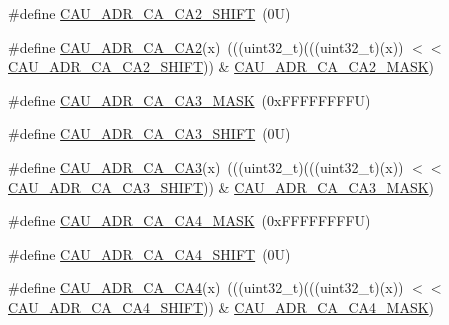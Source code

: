 \begin{DoxyCompactItemize}
\item 
\#define \mbox{\hyperlink{group___c_a_u___register___masks_ga3809e21df053cc0fffe5518686527b59}{C\+A\+U\+\_\+\+A\+D\+R\+\_\+\+C\+A\+\_\+\+C\+A2\+\_\+\+S\+H\+I\+FT}}~(0\+U)
\item 
\#define \mbox{\hyperlink{group___c_a_u___register___masks_ga2e2a6bd48203a8f976196d023b1acec0}{C\+A\+U\+\_\+\+A\+D\+R\+\_\+\+C\+A\+\_\+\+C\+A2}}(x)~(((uint32\+\_\+t)(((uint32\+\_\+t)(x)) $<$$<$ \mbox{\hyperlink{group___c_a_u___register___masks_ga3809e21df053cc0fffe5518686527b59}{C\+A\+U\+\_\+\+A\+D\+R\+\_\+\+C\+A\+\_\+\+C\+A2\+\_\+\+S\+H\+I\+FT}})) \& \mbox{\hyperlink{group___c_a_u___register___masks_ga9294c3d57841472174044b71a5a271ad}{C\+A\+U\+\_\+\+A\+D\+R\+\_\+\+C\+A\+\_\+\+C\+A2\+\_\+\+M\+A\+SK}})
\item 
\#define \mbox{\hyperlink{group___c_a_u___register___masks_ga32fe7c3ce489038db5a7614ff6c376d2}{C\+A\+U\+\_\+\+A\+D\+R\+\_\+\+C\+A\+\_\+\+C\+A3\+\_\+\+M\+A\+SK}}~(0x\+F\+F\+F\+F\+F\+F\+F\+F\+U)
\item 
\#define \mbox{\hyperlink{group___c_a_u___register___masks_ga93cb8cfd1a5fb49e223ca89c7c821ab5}{C\+A\+U\+\_\+\+A\+D\+R\+\_\+\+C\+A\+\_\+\+C\+A3\+\_\+\+S\+H\+I\+FT}}~(0\+U)
\item 
\#define \mbox{\hyperlink{group___c_a_u___register___masks_gacbf10f24a67b200c72e1b7101efa6f6b}{C\+A\+U\+\_\+\+A\+D\+R\+\_\+\+C\+A\+\_\+\+C\+A3}}(x)~(((uint32\+\_\+t)(((uint32\+\_\+t)(x)) $<$$<$ \mbox{\hyperlink{group___c_a_u___register___masks_ga93cb8cfd1a5fb49e223ca89c7c821ab5}{C\+A\+U\+\_\+\+A\+D\+R\+\_\+\+C\+A\+\_\+\+C\+A3\+\_\+\+S\+H\+I\+FT}})) \& \mbox{\hyperlink{group___c_a_u___register___masks_ga32fe7c3ce489038db5a7614ff6c376d2}{C\+A\+U\+\_\+\+A\+D\+R\+\_\+\+C\+A\+\_\+\+C\+A3\+\_\+\+M\+A\+SK}})
\item 
\#define \mbox{\hyperlink{group___c_a_u___register___masks_ga2ed9f31c68a09dba5db3b3e10836f3e6}{C\+A\+U\+\_\+\+A\+D\+R\+\_\+\+C\+A\+\_\+\+C\+A4\+\_\+\+M\+A\+SK}}~(0x\+F\+F\+F\+F\+F\+F\+F\+F\+U)
\item 
\#define \mbox{\hyperlink{group___c_a_u___register___masks_gacd7b74188dccfc62f26f78229fb8a766}{C\+A\+U\+\_\+\+A\+D\+R\+\_\+\+C\+A\+\_\+\+C\+A4\+\_\+\+S\+H\+I\+FT}}~(0\+U)
\item 
\#define \mbox{\hyperlink{group___c_a_u___register___masks_gad525508bdc2b57937df37b9ae1d49017}{C\+A\+U\+\_\+\+A\+D\+R\+\_\+\+C\+A\+\_\+\+C\+A4}}(x)~(((uint32\+\_\+t)(((uint32\+\_\+t)(x)) $<$$<$ \mbox{\hyperlink{group___c_a_u___register___masks_gacd7b74188dccfc62f26f78229fb8a766}{C\+A\+U\+\_\+\+A\+D\+R\+\_\+\+C\+A\+\_\+\+C\+A4\+\_\+\+S\+H\+I\+FT}})) \& \mbox{\hyperlink{group___c_a_u___register___masks_ga2ed9f31c68a09dba5db3b3e10836f3e6}{C\+A\+U\+\_\+\+A\+D\+R\+\_\+\+C\+A\+\_\+\+C\+A4\+\_\+\+M\+A\+SK}})
$$
\end{DoxyCompactItemize}
